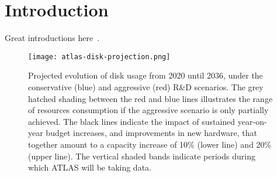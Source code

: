 \section{Introduction}\label{sec:introduction}

Great introductions here~\cite{CERN-LHCC-2022-005,nanobind}.

\begin{figure}
    \centering
    \texttt{[image: atlas-disk-projection.png]}
    \caption{Projected evolution of disk usage from 2020 until 2036, under the conservative (blue) and aggressive (red) R\&D scenarios.
The grey hatched shading between the red and blue lines illustrates the range of resources consumption if the aggressive scenario is only partially achieved.
The black lines indicate the impact of sustained year-on-year budget increases, and improvements in new hardware, that together amount to a capacity increase of 10\% (lower line) and 20\% (upper line).
The vertical shaded bands indicate periods during which ATLAS will be taking data.~\cite{CERN-LHCC-2022-005}}
    \label{fig:atlas-disk-projection}
\end{figure}
